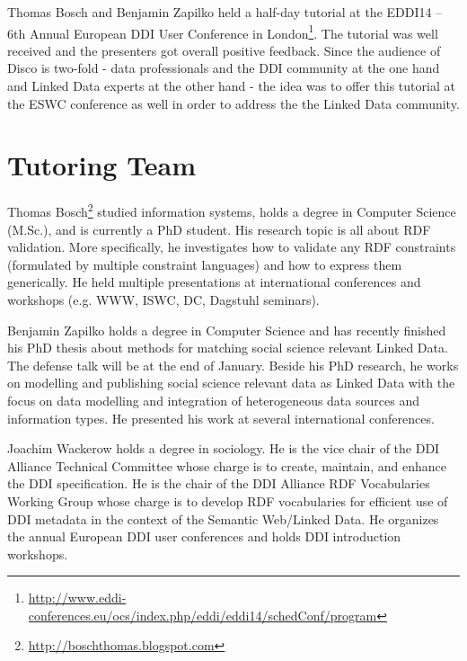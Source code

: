 \documentclass{llncs}
\begin{document}
Thomas Bosch and Benjamin Zapilko held a half-day tutorial at the EDDI14 – 6th Annual European DDI User Conference in London\footnote{\url{http://www.eddi-conferences.eu/ocs/index.php/eddi/eddi14/schedConf/program}}.
The tutorial was well received and the presenters got overall positive feedback. Since the audience of Disco is two-fold - data professionals and the DDI community at the one hand and Linked Data experts at the other hand - the idea was to offer this tutorial at the ESWC conference as well in order to address the the Linked Data community.

\section{Tutoring Team}


Thomas Bosch\footnote{\url{http://boschthomas.blogspot.com}} studied information systems, holds a degree in Computer Science (M.Sc.), and is currently a PhD student.
His research topic is all about RDF validation.
More specifically, he investigates how to validate any RDF constraints (formulated by multiple constraint languages) and how to express them generically. 
He held multiple presentations at international conferences and workshops (e.g. WWW, ISWC, DC, Dagstuhl seminars). 

Benjamin Zapilko holds a degree in Computer Science and has recently finished his PhD thesis about methods for matching social science relevant Linked Data. The defense talk will be at the end of January. Beside his PhD research, he works on modelling and publishing social science relevant data as Linked Data with the focus on data modelling and integration of heterogeneous data sources and information types. He presented his work at several international conferences.

Joachim Wackerow holds a degree in sociology. 
He is the vice chair of the DDI Alliance Technical Committee whose charge is to create, maintain, and enhance the DDI specification.
He is the chair of the DDI Alliance RDF Vocabularies Working Group whose charge is to develop RDF vocabularies for efficient use of DDI metadata in the context of the Semantic Web/Linked Data.
He organizes the annual European DDI user conferences and holds DDI introduction workshops.
\end{document}
